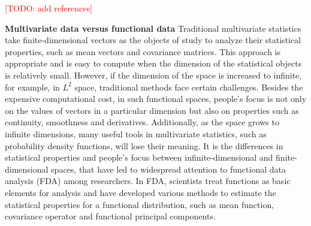 \documentclass{article}
\begin{document}
\textcolor{red}{[TODO: add references]}

\textbf{Multivariate data versus functional data} 
Traditional multivariate statistics take finite-dimensional vectors as the objects of study to analyze their statistical properties, such as mean vectors and covariance matrices. 
This approach is appropriate and is easy to compute when the dimension of the statistical objects is relatively small. 
However, if the dimension of the space is increased to infinite, for example, in $L^2$ space, traditional methods face certain challenges. 
Besides the expensive computational cost, in such functional spaces, people's focus is not only on the values of vectors in a particular dimension but also on properties such as continuity, smoothness and derivatives. 
Additionally, as the space grows to infinite dimensions, many useful tools in multivariate statistics, such as probability density functions, will lose their meaning. 
It is the differences in statistical properties and people's focus between infinite-dimensional and finite-dimensional spaces, that have led to widespread attention to functional data analysis (FDA) among researchers.
In FDA, scientists treat functions as basic elements for analysis and have developed various methods to estimate the statistical properties for a functional distribution, such as mean function, covariance operator and functional principal components.
\end{document}
